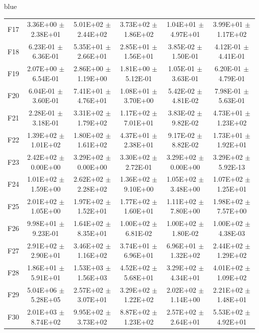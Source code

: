 \documentclass[journal, onecolumn]{IEEEtran}
\begin{document}
\begin{color}{blue}
\begin{table}[htbp!]
\begin{tabular}{c|ccccc}
			F17	 &	3.36E+00	$\pm$	2.38E+01	 &	5.01E+02	$\pm$	2.44E+02		 &	3.73E+02	$\pm$	1.86E+02		 &	1.04E+01	$\pm$	4.97E+01		 &	3.99E+01	$\pm$	1.17E+02	\\		
			F18	 &	6.23E-01	$\pm$	6.36E-01	 &	5.35E+01	$\pm$	2.66E+01		 &	2.85E+01	$\pm$	1.56E+01		 &	3.85E-02	$\pm$	1.50E-01		 &	4.12E-01	$\pm$	4.41E-01	\\		
			F19	 &	2.07E+00	$\pm$	6.54E-01	 &	2.86E+00	$\pm$	1.19E+00		 &	1.81E+00	$\pm$	5.12E-01		 &	1.05E-01	$\pm$	3.63E-01		 &	6.20E-01	$\pm$	4.79E-01	\\		
			F20	 &	6.04E-01	$\pm$	3.60E-01	 &	7.41E+01	$\pm$	4.76E+01		 &	1.08E+01	$\pm$	3.70E+00		 &	5.42E-02	$\pm$	4.81E-02		 &	7.98E-01	$\pm$	5.63E-01	\\		
			F21	 &	2.28E-01	$\pm$	3.18E-01	 &	3.31E+02	$\pm$	1.79E+02		 &	1.17E+02	$\pm$	7.01E+01		 &	3.83E-02	$\pm$	9.82E-02		 &	4.73E+01	$\pm$	1.23E+02	\\		
			F22	 &	1.39E+02	$\pm$	1.01E+02	 &	1.80E+02	$\pm$	1.61E+02		 &	4.37E+01	$\pm$	2.38E+01		 &	9.17E-02	$\pm$	8.82E-02		 &	1.73E+01	$\pm$	1.92E+01	\\		
			F23	 &	2.42E+02	$\pm$	0.00E+00	 &	3.29E+02	$\pm$	0.00E+00		 &	3.30E+02	$\pm$	2.72E-01		 &	3.29E+02	$\pm$	0.00E+00		 &	3.29E+02	$\pm$	5.92E-13	\\		
			F24	 &	1.01E+02	$\pm$	1.59E+00	 &	2.62E+02	$\pm$	2.28E+02		 &	1.36E+02	$\pm$	9.10E+00		 &	1.05E+02	$\pm$	3.48E+00		 &	1.07E+02	$\pm$	1.25E+01	\\		
			F25	 &	2.01E+02	$\pm$	1.05E+00	 &	1.97E+02	$\pm$	1.52E+01		 &	1.77E+02	$\pm$	1.60E+01		 &	1.11E+02	$\pm$	7.80E+00		 &	1.98E+02	$\pm$	7.57E+00	\\		
			F26	 &	9.98E+01	$\pm$	9.23E-01	 &	1.64E+02	$\pm$	8.35E+01		 &	1.00E+02	$\pm$	6.81E-02		 &	1.00E+02	$\pm$	1.80E-02		 &	1.00E+02	$\pm$	4.38E-03	\\		
			F27	 &	2.91E+02	$\pm$	2.90E+01	 &	3.46E+02	$\pm$	1.16E+02		 &	3.74E+01	$\pm$	6.96E+01		 &	6.96E+01	$\pm$	1.32E+02		 &	2.44E+02	$\pm$	1.29E+02	\\		
			F28	 &	1.86E+01	$\pm$	5.91E+01	 &	1.53E+03	$\pm$	1.56E+03		 &	4.52E+02	$\pm$	5.68E+01		 &	3.29E+02	$\pm$	4.34E+01		 &	4.01E+02	$\pm$	1.09E+02	\\		
			F29	 &	5.04E+06	$\pm$	5.28E+05	 &	2.57E+02	$\pm$	3.07E+01		 &	3.29E+02	$\pm$	1.22E+02		 &	2.02E+02	$\pm$	1.14E+00		 &	2.21E+02	$\pm$	1.48E+01	\\		
			F30	 &	2.01E+03	$\pm$	8.74E+02	 &	9.95E+02	$\pm$	3.73E+02		 &	8.87E+02	$\pm$	1.23E+02		 &	2.57E+02	$\pm$	2.64E+01		 &	5.53E+02	$\pm$	4.92E+01	\\		\hline

\end{tabular}
\end{table}
\end{color}
\end{document}
